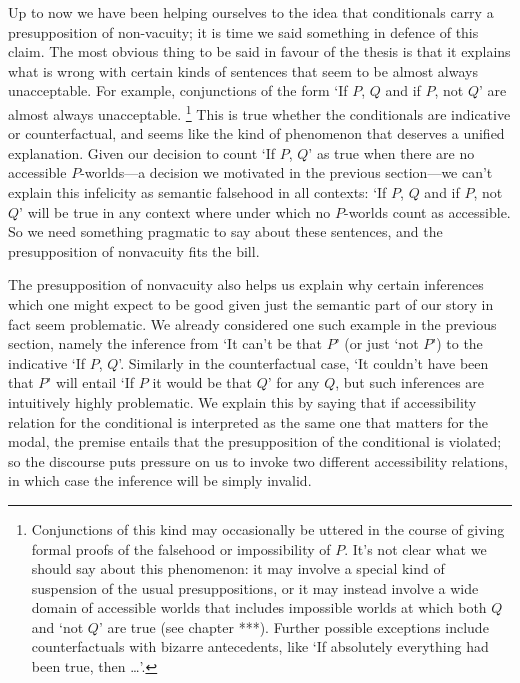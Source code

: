 \documentclass[If.tex]{subfiles}
\begin{document}
Up to now we have been helping ourselves to the idea that conditionals carry a presupposition of non-vacuity; it is time we said something in defence of this claim. The most obvious thing to be said in favour of the thesis is that it explains what is wrong with certain kinds of sentences that seem to be almost always unacceptable. For example, conjunctions of the form ‘If $P$, $Q$ and if $P$, not $Q$’ are almost always unacceptable.%
\footnote{Conjunctions of this kind may occasionally be uttered in the course of giving formal proofs of the falsehood or impossibility of $P$.  It's not clear what we should say about this phenomenon: it may involve a special kind of suspension of the usual presuppositions, or it may instead involve a wide domain of accessible worlds that includes impossible worlds at which both $Q$ and ‘not $Q$’ are true (see chapter ***).  Further possible exceptions include counterfactuals with bizarre antecedents, like ‘If absolutely everything had been true, then …’.  } 
This is true whether the conditionals are indicative or counterfactual, and seems like the kind of phenomenon that deserves a unified explanation. Given our decision to count ‘If $P$, $Q$’ as true when there are no accessible $P$-worlds---a decision we motivated in the previous section---we can't explain this infelicity as semantic falsehood in all contexts: ‘If $P$, $Q$ and if $P$, not $Q$’ will be true in any context where under which no $P$-worlds count as accessible. So we need something pragmatic to say about these sentences, and the presupposition of nonvacuity fits the bill.

The presupposition of nonvacuity also helps us explain why certain inferences which one might expect to be good given just the semantic part of our story in fact seem problematic. We already considered one such example in the previous section, namely the inference from ‘It can't be that $P$’ (or just ‘not $P$’) to the indicative ‘If $P$, $Q$’. Similarly in the counterfactual case, ‘It couldn't have been that $P$’ will entail ‘If $P$ it would be that $Q$’ for any $Q$, but such inferences are intuitively highly problematic.  We explain this by saying that if accessibility relation for the conditional is interpreted as the same one that matters for the modal, the premise entails that the presupposition of the conditional is violated; so the discourse puts pressure on us to invoke two different accessibility relations, in which case the inference will be simply invalid.

\end{document}
